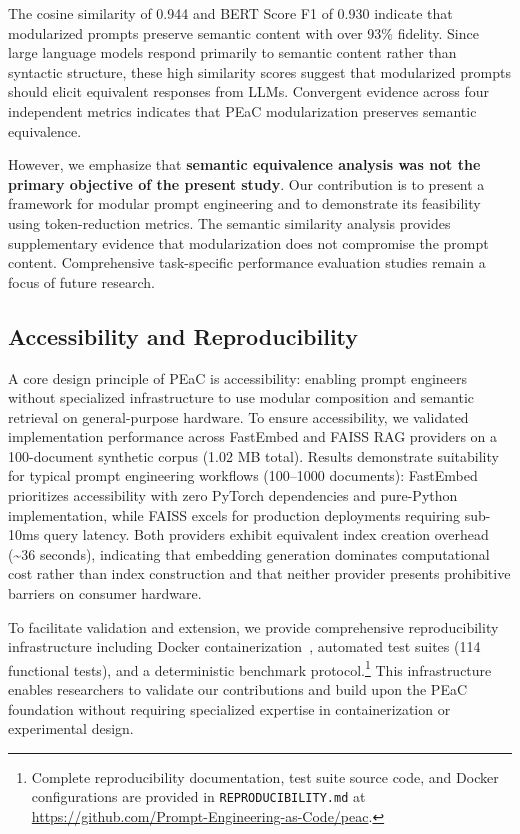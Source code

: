 The cosine similarity of 0.944 and BERT Score F1 of 0.930 indicate that modularized prompts preserve semantic content with over 93\% fidelity. Since large language models respond primarily to semantic content rather than syntactic structure, these high similarity scores suggest that modularized prompts should elicit equivalent responses from LLMs. Convergent evidence across four independent metrics indicates that PEaC modularization preserves semantic equivalence.

However, we emphasize that \textbf{semantic equivalence analysis was not the primary objective of the present study}. Our contribution is to present a framework for modular prompt engineering and to demonstrate its feasibility using token-reduction metrics. The semantic similarity analysis provides supplementary evidence that modularization does not compromise the prompt content. Comprehensive task-specific performance evaluation studies remain a focus of future research.

\subsection{Accessibility and Reproducibility}

A core design principle of PEaC is accessibility: enabling prompt engineers without specialized infrastructure to use modular composition and semantic retrieval on general-purpose hardware. To ensure accessibility, we validated implementation performance across FastEmbed and FAISS RAG providers on a 100-document synthetic corpus (1.02 MB total). Results demonstrate suitability for typical prompt engineering workflows (100--1000 documents): FastEmbed prioritizes accessibility with zero PyTorch dependencies and pure-Python implementation, while FAISS excels for production deployments requiring sub-10ms query latency. Both providers exhibit equivalent index creation overhead (\textasciitilde 36 seconds), indicating that embedding generation dominates computational cost rather than index construction and that neither provider presents prohibitive barriers on consumer hardware.

To facilitate validation and extension, we provide comprehensive reproducibility infrastructure including Docker containerization~\citep{Cito2016Docker}, automated test suites (114 functional tests), and a deterministic benchmark protocol.\footnote{Complete reproducibility documentation, test suite source code, and Docker configurations are provided in \texttt{REPRODUCIBILITY.md} at \url{https://github.com/Prompt-Engineering-as-Code/peac}.} This infrastructure enables researchers to validate our contributions and build upon the PEaC foundation without requiring specialized expertise in containerization or experimental design.
